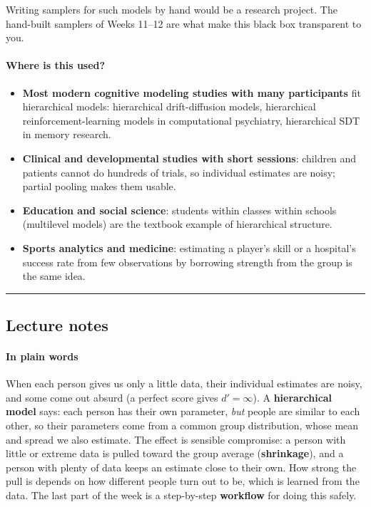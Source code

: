 Writing samplers for such models by hand would be a research project.
The hand-built samplers of Weeks 11--12 are what make this black box
transparent to you.

\paragraph{Where is this used?}

\begin{itemize}
\tightlist
\item
  \textbf{Most modern cognitive modeling studies with many participants}
  fit hierarchical models: hierarchical drift-diffusion models, hierarchical reinforcement-learning models in computational
  psychiatry, hierarchical SDT in memory research.
\item
  \textbf{Clinical and developmental studies with short sessions}:
  children and patients cannot do hundreds of trials, so individual
  estimates are noisy; partial pooling makes them usable.
\item
  \textbf{Education and social science}: students within classes within
  schools (multilevel models) are the textbook example of hierarchical
  structure.
\item
  \textbf{Sports analytics and medicine}: estimating a player's skill or
  a hospital's success rate from few observations by borrowing strength
  from the group is the same idea.
\end{itemize}

\begin{center}\rule{0.5\linewidth}{0.5pt}\end{center}


\subsection{Lecture notes}

\paragraph{In plain words}

When each person gives us only a little data, their individual estimates
are noisy, and some come out absurd (a perfect score gives
\(d' = \infty\)). A \textbf{hierarchical model} says: each person has
their own parameter, \emph{but} people are similar to each other, so
their parameters come from a common group distribution, whose mean and
spread we also estimate. The effect is sensible compromise: a person
with little or extreme data is pulled toward the group average
(\textbf{shrinkage}), and a person with plenty of data keeps an estimate
close to their own. How strong the pull is depends on how different
people turn out to be, which is learned from the data. The last part of
the week is a step-by-step \textbf{workflow} for doing this safely.

